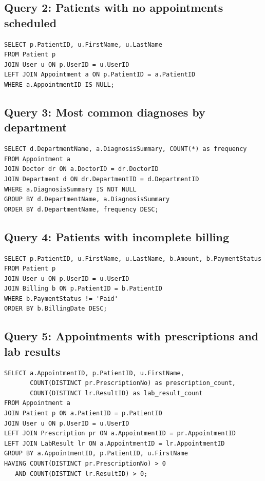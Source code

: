 \subsection*{Query 2: Patients with no appointments scheduled}

\begin{verbatim}
SELECT p.PatientID, u.FirstName, u.LastName
FROM Patient p
JOIN User u ON p.UserID = u.UserID
LEFT JOIN Appointment a ON p.PatientID = a.PatientID
WHERE a.AppointmentID IS NULL;
\end{verbatim}

\subsection*{Query 3: Most common diagnoses by department}

\begin{verbatim}
SELECT d.DepartmentName, a.DiagnosisSummary, COUNT(*) as frequency
FROM Appointment a
JOIN Doctor dr ON a.DoctorID = dr.DoctorID
JOIN Department d ON dr.DepartmentID = d.DepartmentID
WHERE a.DiagnosisSummary IS NOT NULL
GROUP BY d.DepartmentName, a.DiagnosisSummary
ORDER BY d.DepartmentName, frequency DESC;
\end{verbatim}

\subsection*{Query 4: Patients with incomplete billing}

\begin{verbatim}
SELECT p.PatientID, u.FirstName, u.LastName, b.Amount, b.PaymentStatus
FROM Patient p
JOIN User u ON p.UserID = u.UserID
JOIN Billing b ON p.PatientID = b.PatientID
WHERE b.PaymentStatus != 'Paid'
ORDER BY b.BillingDate DESC;
\end{verbatim}

\subsection*{Query 5: Appointments with prescriptions and lab results}

\begin{verbatim}
SELECT a.AppointmentID, p.PatientID, u.FirstName, 
       COUNT(DISTINCT pr.PrescriptionNo) as prescription_count,
       COUNT(DISTINCT lr.ResultID) as lab_result_count
FROM Appointment a
JOIN Patient p ON a.PatientID = p.PatientID
JOIN User u ON p.UserID = u.UserID
LEFT JOIN Prescription pr ON a.AppointmentID = pr.AppointmentID
LEFT JOIN LabResult lr ON a.AppointmentID = lr.AppointmentID
GROUP BY a.AppointmentID, p.PatientID, u.FirstName
HAVING COUNT(DISTINCT pr.PrescriptionNo) > 0 
   AND COUNT(DISTINCT lr.ResultID) > 0;
\end{verbatim}

